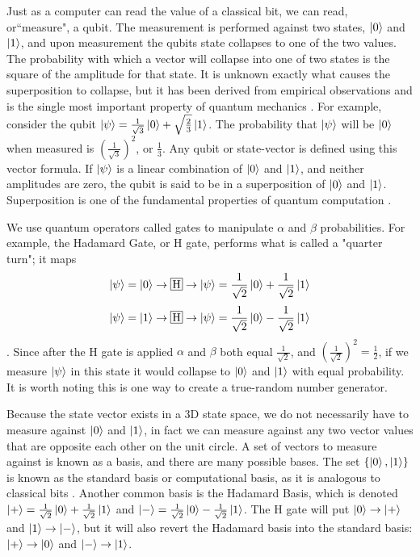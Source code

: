 Just as a computer can read the value of a classical bit, we can read, or``measure", a qubit.
The measurement is performed against two states, $\ket{0}$ and $\ket{1}$, and upon measurement the qubits state collapses to one of the two values.
The probability with which a vector will collapse into one of two states is the square of the amplitude for that state.
It is unknown exactly what causes the superposition to collapse, but it has been derived from empirical observations and is the single most important property of quantum mechanics \cite{qc:agi}.
For example, consider the qubit $\ket{\psi} = \frac{1}{\sqrt{3}}\ket{0} + \sqrt{\frac{2}{3}}\ket{1}$.
The probability that $\ket{\psi}$ will be $\ket{0}$ when measured is $(\frac{1}{\sqrt{3}})^2$, or $\frac{1}{3}$.
Any qubit or state-vector is defined using this vector formula.
If $\ket{\psi}$ is a linear combination of $\ket{0}$ and $\ket{1}$, and neither amplitudes are zero, the qubit is said to be in a superposition of $\ket{0}$ and $\ket{1}$.
Superposition is one of the fundamental properties of quantum computation \cite{qc:agi}. 

We use quantum operators called gates to manipulate $\alpha$ and $\beta$ probabilities.
For example, the Hadamard Gate, or H gate, performs what is called a "quarter turn"; it maps $$\ket{\psi} = \ket{0} \rightarrow \textSq{H} \rightarrow \ket{\psi} = \frac{1}{\sqrt{2}}\ket{0} + \frac{1}{\sqrt{2}}\ket{1}$$  $$\ket{\psi} = \ket{1} \rightarrow \textSq{H} \rightarrow \ket{\psi} = \frac{1}{\sqrt{2}}\ket{0} - \frac{1}{\sqrt{2}}\ket{1}$$ \cite{qc:agi}.
Since after the H gate is applied $\alpha$ and $\beta$ both equal $\frac{1}{\sqrt{2}}$, and ${(\frac{1}{\sqrt{2}})}^2 = \frac{1}{2}$, if we measure $\ket{\psi}$ in this state it would collapse to $\ket{0}$ and $\ket{1}$ with equal probability. 
It is worth noting this is one way to create a true-random number generator.

Because the state vector exists in a 3D state space, we do not necessarily have to measure against $\ket{0}$ and $\ket{1}$, in fact we can measure against any two vector values that are opposite each other on the unit circle. 
A set of vectors to measure against is known as a basis, and there are many possible bases. 
The set $\{\ket{0},\ket{1}\}$ is known as the standard basis or computational basis, as it is analogous to classical bits \cite{qcftgu}.
Another common basis is the Hadamard Basis, which is denoted $\ket{+} = \frac{1}{\sqrt{2}}\ket{0} + \frac{1}{\sqrt{2}}\ket{1}$ and $\ket{-} = \frac{1}{\sqrt{2}}\ket{0} - \frac{1}{\sqrt{2}}\ket{1}$.
The H gate will put $\ket{0} \rightarrow \ket{+}$ and $\ket{1} \rightarrow \ket{-}$, but it will also revert the Hadamard basis into the standard basis: $\ket{+} \rightarrow \ket{0}$ and $\ket{-} \rightarrow \ket{1}$.

